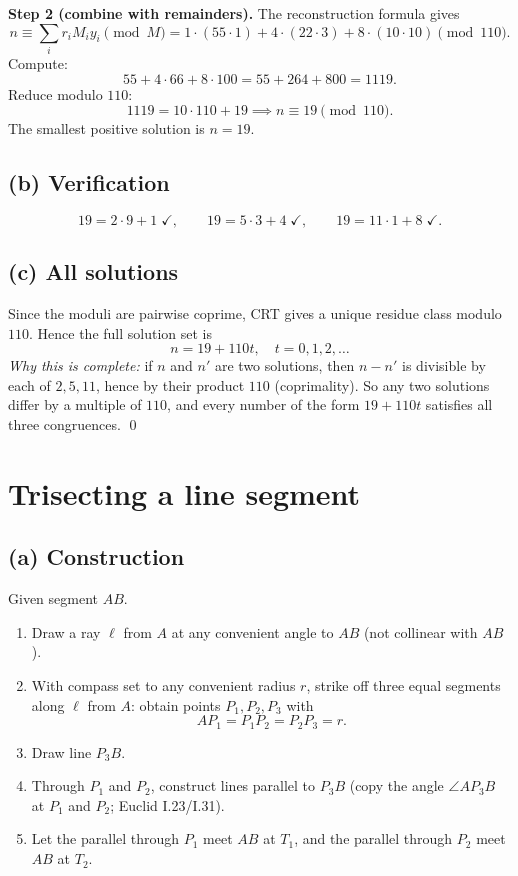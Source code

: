 \documentclass[11pt]{article}
\begin{document}
	\textbf{Step 2 (combine with remainders).} The reconstruction formula gives
	\[
	n \equiv \sum_i r_i M_i y_i \pmod M
	= 1\cdot(55\cdot 1) + 4\cdot(22\cdot 3) + 8\cdot(10\cdot 10) \pmod{110}.
	\]
	Compute:
	\[
	55 + 4\cdot 66 + 8\cdot 100 = 55 + 264 + 800 = 1119.
	\]
	Reduce modulo $110$:
	\[
	1119 = 10\cdot 110 + 19 \implies n \equiv 19 \pmod{110}.
	\]
	The smallest positive solution is $\boxed{n = 19}$.
	
	\subsection*{(b) Verification}
	\[
	19 = 2\cdot 9 + 1 \;\checkmark,\qquad
	19 = 5\cdot 3 + 4 \;\checkmark,\qquad
	19 = 11\cdot 1 + 8 \;\checkmark.
	\]
	
	\subsection*{(c) All solutions}
	Since the moduli are pairwise coprime, CRT gives a unique residue class modulo $110$. Hence the full solution set is
	\[
	\boxed{n = 19 + 110t,\quad t = 0,1,2,\dots}
	\]
	\emph{Why this is complete:} if $n$ and $n'$ are two solutions, then $n - n'$ is divisible by each of $2, 5, 11$, hence by their product $110$ (coprimality). So any two solutions differ by a multiple of $110$, and every number of the form $19 + 110t$ satisfies all three congruences. \qed
	
	\section{Trisecting a line segment}
	
	\subsection*{(a) Construction}
	Given segment $AB$.
	
	\begin{enumerate}[label=\textbf{Step \arabic*.}]
		\item Draw a ray $\ell$ from $A$ at any convenient angle to $AB$ (not collinear with $AB$).
		\item With compass set to any convenient radius $r$, strike off three equal segments along $\ell$ from $A$: obtain points $P_1, P_2, P_3$ with
		\[
		AP_1 = P_1P_2 = P_2P_3 = r.
		\]
		\item Draw line $P_3B$.
		\item Through $P_1$ and $P_2$, construct lines parallel to $P_3B$ (copy the angle $\angle AP_3B$ at $P_1$ and $P_2$; Euclid I.23/I.31).
		\item Let the parallel through $P_1$ meet $AB$ at $T_1$, and the parallel through $P_2$ meet $AB$ at $T_2$.
	\end{enumerate}
	
\end{document}
